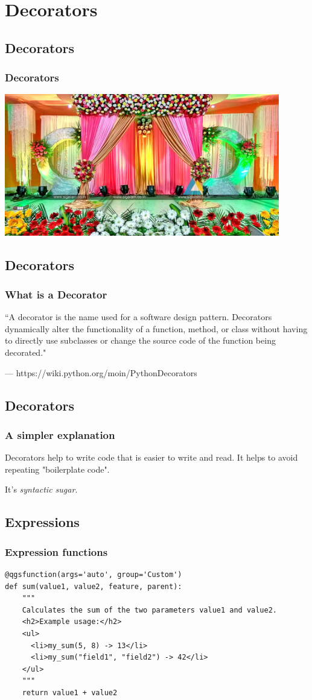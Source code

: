 \section{Decorators}


\subsection{Decorators}
\begin{frame}
\frametitle{Decorators}
	\includegraphics[width=0.9\textwidth]{img/decorators.jpg}
\end{frame}

\subsection{Decorators}
\begin{frame}
\frametitle{What is a Decorator}
\setlength{\epigraphwidth}{0.9\textwidth}
\epigraph{``A decorator is the name used for a software design pattern.
Decorators dynamically alter the functionality of a function, method, or class without having to directly use subclasses or change the source code of the function being decorated."}{--- https://wiki.python.org/moin/PythonDecorators}

\end{frame}

\subsection{Decorators}
\begin{frame}
\frametitle{A simpler explanation}
Decorators help to write code that is easier to write and read. It helps to avoid repeating "boilerplate code".

It's \emph{syntactic sugar}.
\end{frame}


\subsection{Expressions}
\begin{frame}[fragile]
\frametitle{Expression functions}
\begin{lstlisting}[style=pythoncode]
@qgsfunction(args='auto', group='Custom')
def sum(value1, value2, feature, parent):
    """
    Calculates the sum of the two parameters value1 and value2.
    <h2>Example usage:</h2>
    <ul>
      <li>my_sum(5, 8) -> 13</li>
      <li>my_sum("field1", "field2") -> 42</li>
    </ul>
    """
    return value1 + value2
\end{lstlisting}
\end{frame}


